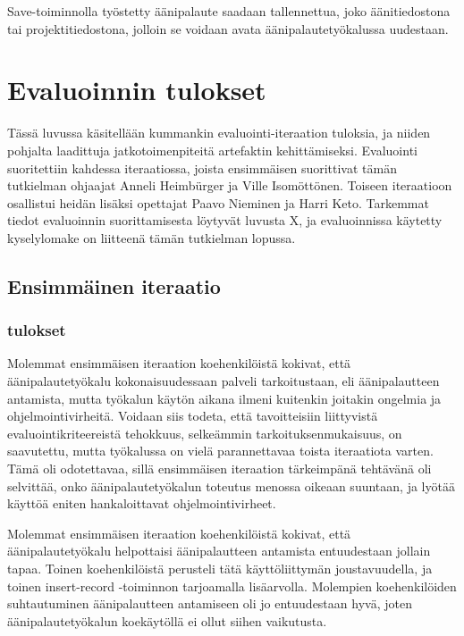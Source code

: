 \documentclass[utf8]{gradu3}
\begin{document}
Save-toiminnolla työstetty äänipalaute saadaan tallennettua, joko äänitiedostona tai projektitiedostona, jolloin se voidaan avata äänipalautetyökalussa uudestaan.

%

\chapter{Evaluoinnin tulokset}

Tässä luvussa käsitellään kummankin evaluointi-iteraation tuloksia, ja niiden pohjalta laadittuja jatkotoimenpiteitä artefaktin kehittämiseksi. Evaluointi suoritettiin kahdessa iteraatiossa, joista ensimmäisen suorittivat tämän tutkielman ohjaajat Anneli Heimbürger ja Ville Isomöttönen. Toiseen iteraatioon osallistui heidän lisäksi opettajat Paavo Nieminen ja Harri Keto. Tarkemmat tiedot evaluoinnin suorittamisesta löytyvät luvusta X, ja evaluoinnissa käytetty kyselylomake on liitteenä tämän tutkielman lopussa.

\section{Ensimmäinen iteraatio}

\subsection{tulokset}

Molemmat ensimmäisen iteraation koehenkilöistä kokivat, että äänipalautetyökalu kokonaisuudessaan palveli tarkoitustaan, eli äänipalautteen antamista, mutta työkalun käytön aikana ilmeni kuitenkin joitakin ongelmia ja ohjelmointivirheitä. Voidaan siis todeta, että tavoitteisiin liittyvistä evaluointikriteereistä tehokkuus, selkeämmin tarkoituksenmukaisuus, on saavutettu, mutta työkalussa on vielä parannettavaa toista iteraatiota varten. Tämä oli odotettavaa, sillä ensimmäisen iteraation tärkeimpänä tehtävänä oli selvittää, onko äänipalautetyökalun toteutus menossa oikeaan suuntaan, ja lyötää käyttöä eniten hankaloittavat ohjelmointivirheet.

Molemmat ensimmäisen iteraation koehenkilöistä kokivat, että äänipalautetyökalu helpottaisi äänipalautteen antamista entuudestaan jollain tapaa. Toinen koehenkilöistä perusteli tätä käyttöliittymän joustavuudella, ja toinen insert-record -toiminnon tarjoamalla lisäarvolla. Molempien koehenkilöiden suhtautuminen äänipalautteen antamiseen oli jo entuudestaan hyvä, joten äänipalautetyökalun koekäytöllä ei ollut siihen vaikutusta.
\end{document}
